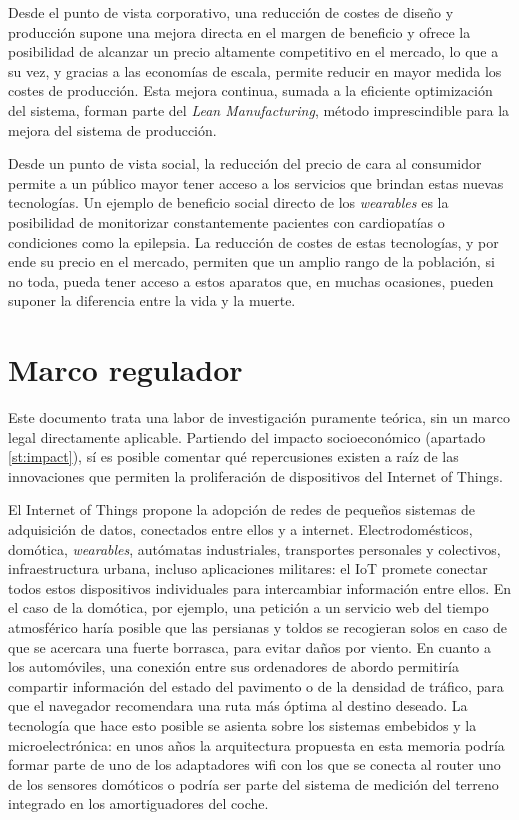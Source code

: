 \documentclass[12pt]{report} %
\begin{document}
	Desde el punto de vista corporativo, una reducción de costes de diseño y producción supone una mejora directa en el margen de beneficio y ofrece la posibilidad de alcanzar un precio altamente competitivo en el mercado, lo que a su vez, y gracias a las economías de escala, permite reducir en mayor medida los costes de producción. Esta mejora continua, sumada a la eficiente optimización del sistema, forman parte del \textit{Lean Manufacturing}, método imprescindible para la mejora del sistema de producción.
	
	Desde un punto de vista social, la reducción del precio de cara al consumidor permite a un público mayor tener acceso a los servicios que brindan estas nuevas tecnologías. Un ejemplo de beneficio social directo de los \textit{wearables} es la posibilidad de monitorizar constantemente pacientes con cardiopatías o condiciones como la epilepsia. La reducción de costes de estas tecnologías, y por ende su precio en el mercado, permiten que un amplio rango de la población, si no toda, pueda tener acceso a estos aparatos que, en muchas ocasiones, pueden suponer la diferencia entre la vida y la muerte.

	\section{Marco regulador}

	Este documento trata una labor de investigación puramente teórica, sin un marco legal directamente aplicable. Partiendo del impacto socioeconómico (apartado \ref{st:impact}), sí es posible comentar qué repercusiones existen a raíz de las innovaciones que permiten la proliferación de dispositivos del Internet of Things.
	
	El Internet of Things propone la adopción de redes de pequeños sistemas de adquisición de datos, conectados entre ellos y a internet. Electrodomésticos, domótica, \textit{wearables}, autómatas industriales, transportes personales y colectivos, infraestructura urbana, incluso aplicaciones militares: el IoT promete conectar todos estos dispositivos individuales para intercambiar información entre ellos. En el caso de la domótica, por ejemplo, una petición a un servicio web del tiempo atmosférico haría posible que las persianas y toldos se recogieran solos en caso de que se acercara una fuerte borrasca, para evitar daños por viento. En cuanto a los automóviles, una conexión entre sus ordenadores de abordo permitiría compartir información del estado del pavimento o de la densidad de tráfico, para que el navegador recomendara una ruta más óptima al destino deseado. La tecnología que hace esto posible se asienta sobre los sistemas embebidos y la microelectrónica: en unos años la arquitectura propuesta en esta memoria podría formar parte de uno de los adaptadores wifi con los que se conecta al router uno de los sensores domóticos o podría ser parte del sistema de medición del terreno integrado en los amortiguadores del coche.
	
\end{document}
